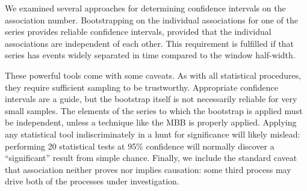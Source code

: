 \documentclass[letterpaper,11pt]{article}
\begin{document}
We examined several approaches for determining confidence intervals on
the association number. Bootstrapping on the individual associations
for one of the series provides reliable confidence intervals, provided
that the individual associations are independent of each other. This
requirement is fulfilled if that series has events widely separated in
time compared to the window half-width.

These powerful tools come with some caveats. As with all statistical
procedures, they require sufficient sampling to be
trustworthy. Appropriate confidence intervals are a guide, but the
bootstrap itself is not necessarily reliable for very small
samples. The elements of the series to which the bootstrap is applied
must be independent, unless a technique like the MBB is properly
applied. Applying any statistical tool indiscriminately in a hunt for
significance will likely mislead: performing 20 statistical tests
at 95\% confidence will normally discover a ``significant'' result
from simple chance. Finally, we include the standard caveat that
association neither proves nor implies causation: some third process
may drive both of the processes under investigation.

\appendix
\end{document}
